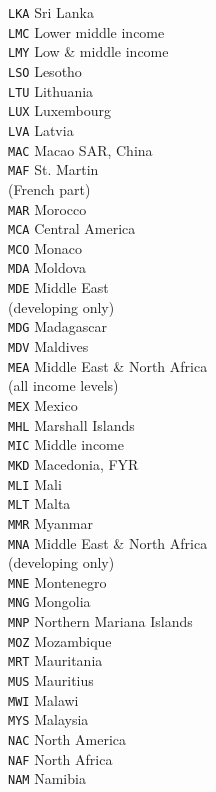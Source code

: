 \begin{multicols}{3}
{\texttt{LKA}	Sri Lanka\\
\texttt{LMC}	Lower middle income\\
\texttt{LMY}	Low \& middle income\\
\texttt{LSO}	Lesotho\\
\texttt{LTU}	Lithuania\\
\texttt{LUX}	Luxembourg\\
\texttt{LVA}	Latvia\\
\texttt{MAC}	Macao SAR, China\\
\texttt{MAF}	St. Martin\\
(French part)\\
\texttt{MAR}	Morocco\\
\texttt{MCA}	Central America\\
\texttt{MCO}	Monaco\\
\texttt{MDA}	Moldova\\
\texttt{MDE}	Middle East\\
(developing only)\\
\texttt{MDG}	Madagascar\\
\texttt{MDV}	Maldives\\
\texttt{MEA}	Middle East \& North Africa\\
(all income levels)\\
\texttt{MEX}	Mexico\\
\texttt{MHL}	Marshall Islands\\
\texttt{MIC}	Middle income\\
\texttt{MKD}	Macedonia, FYR\\
\texttt{MLI}	Mali\\
\texttt{MLT}	Malta\\
\texttt{MMR}	Myanmar\\
\texttt{MNA}	Middle East \& North Africa\\
(developing only)\\
\texttt{MNE}	Montenegro\\
\texttt{MNG}	Mongolia\\
\texttt{MNP}	Northern Mariana Islands\\
\texttt{MOZ}	Mozambique\\
\texttt{MRT}	Mauritania\\
\texttt{MUS}	Mauritius\\
\texttt{MWI}	Malawi\\
\texttt{MYS}	Malaysia\\
\texttt{NAC}	North America\\
\texttt{NAF}	North Africa\\
\texttt{NAM}	Namibia\\
}
\end{multicols}
